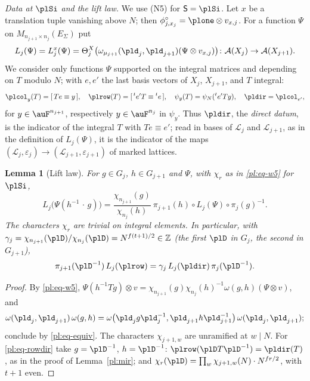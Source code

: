 \documentclass[10pt]{amsart}
\newtheorem{lemma}[theorem]{Lemma}
\theoremstyle{definition}
\theoremstyle{remark}
\newcommand{\Z}{\mathbb Z}
\begin{document}
\emph{Data at $\plSi$ and the lift law.} We use (N5) for $\mathsf S=\plSi$. Let $x$ be a
translation tuple vanishing above $N$; then $\phi^\circ_{j,x_j}=\plone\otimes v_{x,j}$. For a
function $\Psi$ on $M_{n_{j+1}\times n_j}(E_\Sigma)$ put
\[
L_j(\Psi)=L^x_j(\Psi)=\Theta^X_j\bigl(\omega_{\mu_{j+1}}(\pld_j,\pld_{j+1})(\Psi\otimes v_{x,j})
\bigr)\colon\mathcal A(X_j)\to\mathcal A(X_{j+1}).
\]
We consider only functions $\Psi$ supported on the integral matrices and depending on $T$ modulo
$N$; with $e,e'$ the last basis vectors of $X_j$, $X_{j+1}$, and $T$ integral:
\[
\plcol_y(T)=[\,Te\equiv y\,],\quad\plrow(T)=[\,{}^te'T\equiv{}^te\,],\quad\psi_y(T)=\psi_N({}^te'Ty),
\quad\pldir=\plcol_{e'},
\]
for $y\in\auF^{n_{j+1}}$, respectively $y\in\auF^{n_j}$ in $\psi_y$. Thus $\pldir$, the
\emph{direct datum}, is the indicator of the integral $T$ with $Te\equiv e'$; read in bases of
$\mathcal L_j$ and $\mathcal L_{j+1}$, as in the definition of $L_j(\Psi)$, it is the indicator of the maps
$(\mathcal L_j,\varepsilon_j)\to(\mathcal L_{j+1},\varepsilon_{j+1})$ of marked lattices.

\begin{lemma}[Lift law]\label{pl:law}
For $g\in G_j$, $h\in G_{j+1}$ and $\Psi$, with $\chi_r$ as in \eqref{pl:eq-w5} for $\plSi$,
\[
L_j\bigl(\Psi(h^{-1}\,\cdot\,g)\bigr)=\frac{\chi_{n_{j+1}}(g)}{\chi_{n_j}(h)}\ \pi_{j+1}(h)\circ
L_j(\Psi)\circ\pi_j(g)^{-1}.
\]
The characters $\chi_r$ are trivial on integral elements. In particular, with $\gamma_j=\chi_{n_{
j+1}}(\plD)/\chi_{n_j}(\plD)=N^{f(t+1)/2}\in\Z$ (the first $\plD$ in $G_j$, the second in
$G_{j+1}$),
\begin{equation}\label{pl:eq-rowdir}
\pi_{j+1}(\plD^{-1})\,L_j(\plrow)=\gamma_j\,L_j(\pldir)\,\pi_j(\plD^{-1}).
\end{equation}
\end{lemma}
\begin{proof}
By \eqref{pl:eq-w5}, $\Psi(h^{-1}Tg)\otimes v=\chi_{n_{j+1}}(g)\chi_{n_j}(h)^{-1}\omega(g,h)(\Psi
\otimes v)$, and
\[
\omega(\pld_j,\pld_{j+1})\,\omega(g,h)=\omega\bigl(\pld_jg\pld_j^{-1},\pld_{j+1}h\pld_{j+1}^{-1}
\bigr)\,\omega(\pld_j,\pld_{j+1});
\]
conclude by \eqref{pl:eq-equiv}. The characters $\chi_{j+1,
w}$ are unramified at $w\mid N$. For \eqref{pl:eq-rowdir} take $g=\plD^{-1}$, $h=\plD^{-1}$:
$\plrow(\plD T\plD^{-1})=\pldir(T)$, as in the proof of Lemma~\ref{pl:mir}; and $\chi_r(\plD)=
\prod_w\chi_{j+1,w}(N)\cdot N^{fr/2}$, with $t+1$ even.
\end{proof}
\end{document}
